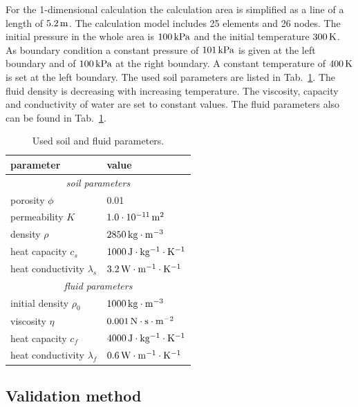For the 1-dimensional calculation the calculation area is simplified as a line of a length of $\unit[5.2]{m}$. The calculation model includes 25 elements and 26 nodes. The initial pressure in the whole area is $\unit[100]{kPa}$ and the initial temperature $\unit[300]{K}$. As boundary condition a constant pressure of $\unit[101]{kPa}$ is given at the left boundary and of $\unit[100]{kPa}$ at the right boundary. A constant temperature of $\unit[400]{K}$ is set at the left boundary. The used soil parameters are listed in Tab.~\ref{tab41}. The fluid density is decreasing with increasing temperature. The viscosity, capacity and conductivity of water are set to constant values. The fluid parameters also can be found in Tab.~\ref{tab41}.
\begin{table}[htbp]
\caption{\label{tab41}Used soil and fluid parameters.}
\begin{center}
\begin{tabular}{ll}
\toprule
parameter 			& value \\
\midrule
\multicolumn{2}{c}{\textit{soil parameters}}\\
porosity $\phi$   	& 0.01 \\	
permeability $K$   	& $\unit[1.0 \cdot 10^{-11}]{m^{2}}$ \\
density $\rho$     	& $\unit[2850]{kg \cdot m^{-3}}$ \\
heat capacity $c_s$   	& $\unit[1000]{J \cdot kg^{-1} \cdot K^{-1}}$ \\
heat conductivity $\lambda_s$	& $\unit[3.2]{W \cdot m^{-1} \cdot K^{-1}}$ \\
\cmidrule{1-2}
\multicolumn{2}{c}{\textit{fluid parameters}}\\
initial density $\rho_0$ 	& $\unit[1000]{kg \cdot m^{-3}}$\\
viscosity $\eta$        	& $\unit[0.001]{N \cdot s \cdot m^{-2}}$ \\
heat capacity $c_f$    	& $\unit[4000]{J \cdot kg^{-1} \cdot K^{-1}}$ \\
heat conductivity $\lambda_f$	& $\unit[0.6]{W \cdot m^{-1} \cdot K^{-1}}$ \\
\bottomrule
\end{tabular}
\end{center}
\end{table}

\subsection{Validation method}

